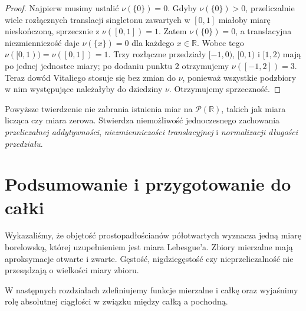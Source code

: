\begin{proof}
Najpierw musimy ustalić $\nu(\{0\})=0$.
Gdyby $\nu(\{0\})>0$, przeliczalnie wiele
rozłącznych translacji singletonu zawartych w $[0,1]$
miałoby miarę nieskończoną, sprzecznie z
$\nu([0,1])=1$. Zatem $\nu(\{0\})=0$,
a translacyjna niezmienniczość daje
$\nu(\{x\})=0$ dla każdego $x\in\mathbb R$.
Wobec tego $\nu([0,1))=\nu([0,1])=1$.
Trzy rozłączne przedziały $[-1,0)$, $[0,1)$
i $[1,2)$ mają po jednej jednostce miary;
po dodaniu punktu $2$ otrzymujemy
$\nu([-1,2])=3$. Teraz dowód Vitaliego stosuje się
bez zmian do $\nu$, ponieważ wszystkie podzbiory
w nim występujące należałyby do dziedziny $\nu$.
Otrzymujemy sprzeczność.
\end{proof}

\begin{uwaga}
Powyższe twierdzenie nie zabrania istnienia miar na
$\mathcal P(\mathbb R)$, takich jak miara licząca
czy miara zerowa. Stwierdza niemożliwość jednoczesnego
zachowania \emph{przeliczalnej addytywności},
\emph{niezmienniczości translacyjnej} i
\emph{normalizacji długości przedziału}.
\end{uwaga}

\section{Podsumowanie i przygotowanie do całki}

Wykazaliśmy, że objętość prostopadłościanów
półotwartych wyznacza jedną miarę borelowską,
której uzupełnieniem jest miara Lebesgue'a. Zbiory
mierzalne mają aproksymacje otwarte i zwarte.
Gęstość, nigdziegęstość czy nieprzeliczalność
nie przesądzają o wielkości miary zbioru.

W następnych rozdziałach zdefiniujemy funkcje
mierzalne i całkę oraz wyjaśnimy rolę absolutnej
ciągłości w związku między całką a pochodną.
